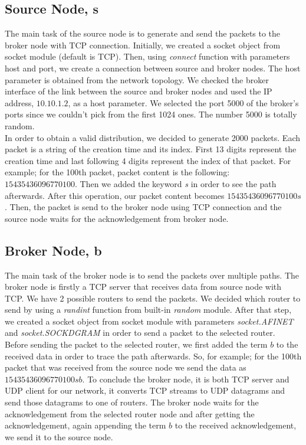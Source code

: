 \documentclass[conference]{IEEEtran}
\begin{document}
\subsection{Source Node, \textbf{s}}
The main task of the source node is to generate and send the packets to the broker node with TCP connection. Initially, we created a socket object from socket module (default is TCP). Then, using \textit{connect} function with parameters host and port, we create a connection between source and broker nodes. The host parameter is obtained from the network topology. We checked the broker interface of the link between the source and broker nodes and used the IP address, ${10.10.1.2}$, as a host parameter. We selected the port 5000 of the broker's ports since we couldn't pick from the first 1024 ones. The number 5000 is totally random. \\
In order to obtain a valid distribution, we decided to generate 2000 packets. Each packet is a string of the creation time and its index. First 13 digits represent the creation time and last following 4 digits represent the index of that packet. For example; for the 100th packet, packet content is the following: $15435436096770100$. Then we added the keyword \textit{s} in order to see the path afterwards. After this operation, our packet content becomes $15435436096770100s$. Then, the packet is send to the broker node using TCP connection and the source node waits for the acknowledgement from broker node.
\subsection{Broker Node, \textbf{b}}
The main task of the broker node is to send the packets over multiple paths. The broker node is firstly a TCP server that receives data from source node with TCP. We have 2 possible routers to send the packets. We decided which router to send by using a \textit{randint} function from built-in \textit{random} module. After that step, we created a socket object from socket module with parameters \textit{socket.AF\textunderscore INET} and \textit{socket.SOCK\textunderscore DGRAM} in order to send a packet to the selected router. \\
Before sending the packet to the selected router, we first added the term $b$ to the received data in order to trace the path afterwards. So, for example; for the 100th packet that was received from the source node we send the data as $15435436096770100sb$. To conclude the broker node, it is both TCP server and UDP client for our network, it converts TCP streams to UDP datagrams and send those datagrams to one of routers. The broker node waits for the acknowledgement from the selected router node and after getting the acknowledgement, again appending the term $b$ to the received acknowledgement, we send it to the source node.
\end{document}
